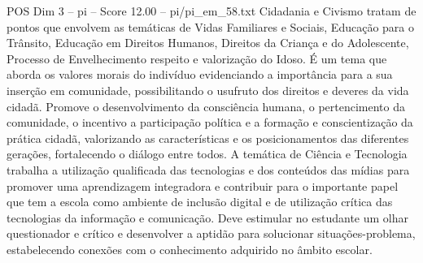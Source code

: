 \begin{textsample}{POS Dim 3 – pi – Score 12.00 – pi/pi\_em\_58.txt}
Cidadania e Civismo tratam de pontos que envolvem as temáticas de Vidas Familiares e Sociais, Educação para o Trânsito, Educação em Direitos Humanos, Direitos da Criança e do Adolescente, Processo de Envelhecimento respeito e valorização do Idoso.
É um tema que aborda os valores morais do indivíduo evidenciando a importância para a sua inserção em comunidade, possibilitando o usufruto dos direitos e deveres da vida cidadã.
Promove o desenvolvimento da consciência humana, o pertencimento da comunidade, o incentivo a participação política e a formação e conscientização da prática cidadã, valorizando as características e os posicionamentos das diferentes gerações, fortalecendo o diálogo entre todos.
A temática de Ciência e Tecnologia trabalha a utilização qualificada das tecnologias e dos conteúdos das mídias para promover uma aprendizagem integradora e contribuir para o importante papel que tem a escola como ambiente de inclusão digital e de utilização crítica das tecnologias da informação e comunicação.
Deve estimular no estudante um olhar questionador e crítico e desenvolver a aptidão para solucionar situações-problema, estabelecendo conexões com o conhecimento adquirido no âmbito escolar.

\end{textsample}
